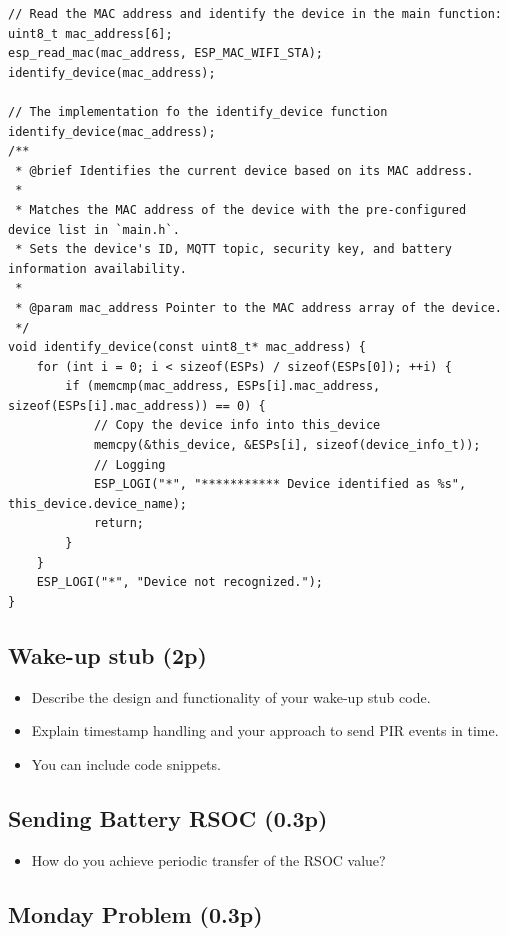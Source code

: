 \documentclass[A4,10pt]{article}
\begin{document}
\begin{itemize}
\begin{verbatim}
// Read the MAC address and identify the device in the main function:
uint8_t mac_address[6];
esp_read_mac(mac_address, ESP_MAC_WIFI_STA);
identify_device(mac_address);

// The implementation fo the identify_device function
identify_device(mac_address);
/**
 * @brief Identifies the current device based on its MAC address.
 *
 * Matches the MAC address of the device with the pre-configured device list in `main.h`.
 * Sets the device's ID, MQTT topic, security key, and battery information availability.
 *
 * @param mac_address Pointer to the MAC address array of the device.
 */
void identify_device(const uint8_t* mac_address) {
    for (int i = 0; i < sizeof(ESPs) / sizeof(ESPs[0]); ++i) {
        if (memcmp(mac_address, ESPs[i].mac_address, sizeof(ESPs[i].mac_address)) == 0) {
            // Copy the device info into this_device
            memcpy(&this_device, &ESPs[i], sizeof(device_info_t));
            // Logging
            ESP_LOGI("*", "*********** Device identified as %s", this_device.device_name);
            return;
        }
    }
    ESP_LOGI("*", "Device not recognized.");
}
    \end{verbatim}
    
\end{itemize}


\subsection{Wake-up stub (2p)}

\begin{itemize}
	\item Describe the design and functionality of your wake-up stub code.
	\item Explain timestamp handling and your approach to send PIR events in time.
	\item You can include code snippets. 
\end{itemize} 

\subsection{Sending Battery RSOC (0.3p)}

\begin{itemize}
	\item How do you achieve periodic transfer of the RSOC value?
\end{itemize}

\subsection{Monday Problem (0.3p) }
\end{document}

